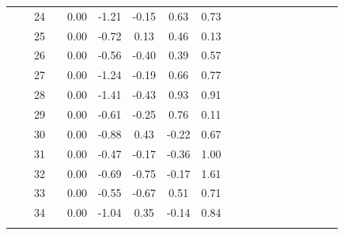 \documentclass[a4paper,11pt,oneside,openany]{jsbook}
\newcommand{\bhline}[1]{\noalign{\hrule height #1}}
\begin{document}
\begin{table}[h!]
\begin{center}
\begin{tabular}{ccccccccccccccccccc}
 &  & 24 &  & 0.00 & -1.21 & -0.15 & 0.63  & 0.73 \\
 &  & 25 &  & 0.00 & -0.72 & 0.13  & 0.46  & 0.13 \\
 &  & 26 &  & 0.00 & -0.56 & -0.40 & 0.39  & 0.57 \\
 &  & 27 &  & 0.00 & -1.24 & -0.19 & 0.66  & 0.77 \\
 &  & 28 &  & 0.00 & -1.41 & -0.43 & 0.93  & 0.91 \\
 &  & 29 &  & 0.00 & -0.61 & -0.25 & 0.76  & 0.11 \\
 &  & 30 &  & 0.00 & -0.88 & 0.43  & -0.22 & 0.67 \\
 &  & 31 &  & 0.00 & -0.47 & -0.17 & -0.36 & 1.00 \\
 &  & 32 &  & 0.00 & -0.69 & -0.75 & -0.17 & 1.61 \\
 &  & 33 &  & 0.00 & -0.55 & -0.67 & 0.51  & 0.71 \\
 &  & 34 &  & 0.00 & -1.04 & 0.35  & -0.14 & 0.84\\
\bhline{1pt}
\end{tabular}
\label{t10param2}
\end{center}
\end{table}
\end{document}
